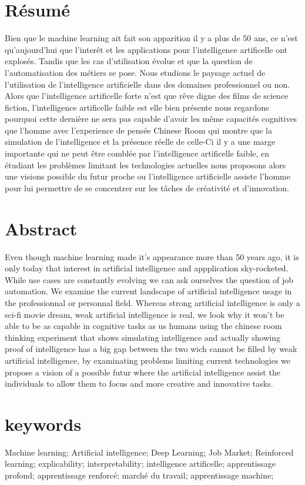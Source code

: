 \section*{Résumé}
Bien que le machine learning ait fait son apparition il y a plus de 50 ans,
ce n'est qu'aujourd'hui que l'interêt et les applications pour
l'intelligence artificelle ont explosés. Tandis que les cas d'utilisation 
évolue et que la question de l'automatisation des métiers se pose.
Nous etudions le paysage actuel de l'utilisation de l'intelligence 
artificielle dans des domaines professionnel ou non.
Alors que l'intelligence artificelle forte n'est que rêve digne des films 
de science fiction, l'intelligence artificelle faible est elle bien présente 
nous regardons pourquoi cette dernière ne sera pas capable d'avoir les même capacités 
cognitives que l'homme avec l'experience de pensée Chinese Room qui 
montre que la simulation de l'intelligence et la présence réelle de celle-Ci 
il y a une marge importante qui ne peut être comblée 
par l'intelligence artificelle faible, en étudiant les problèmes limitant les 
technologies actuelles nous proposons alors une visions possible du futur 
proche ou l'intelligence artificielle assiste l'homme pour lui 
permettre de se concentrer sur les tâches de créativité et d'innovation. 

\section*{Abstract}
Even though machine learning made it's appearance more than 50 years ago,
it is only today that interest in artificial intelligence and appplication
sky-rocketed. While use cases are constantly evolving we can ask ourselves 
the question of job automation.
We examine the current landscape of artificial intelligence usage in the professionnal
or personnal field.
Whereas strong artificial intelligence is only a sci-fi movie dream, weak 
artificial intelligence is real, we look why it won't be able to be as capable 
in cognitive tasks as us humans using the chinese room thinking experiment 
that shows simulating intelligence and actually showing proof of intelligence 
has a big gap between the two wich cannot be filled by weak artificial intelligence,
by examinating problems limiting current technologies we propose 
a vision of a possible futur where the artificial intelligence assist the individuals
to allow them to focus and more creative and innovative tasks.

\section*{keywords}
Machine learning; Artificial intelligence; Deep Learning; 
Job Market; Reinforced learning; explicability; interpretability;
intelligence artificelle; apprentissage profond; apprentissage renforcé;
marché du travail; apprentissage machine;

